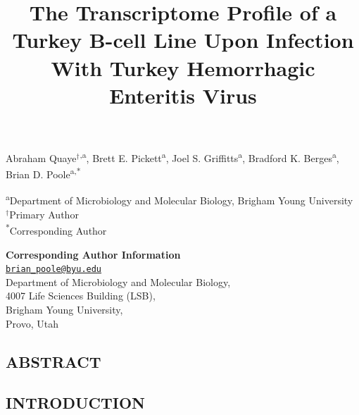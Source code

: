 \documentclass[
]{article}
\title{The Transcriptome Profile of a Turkey B-cell Line Upon Infection
With Turkey Hemorrhagic Enteritis Virus}
\author{}
\date{\vspace{-2.5em}}
\begin{document}
\maketitle

\vspace{5mm}

Abraham Quaye\({^\dagger}\)\textsuperscript{,a}, Brett E.
Pickett\textsuperscript{a}, Joel S. Griffitts\textsuperscript{a},
Bradford K. Berges\textsuperscript{a}, Brian D.
Poole\textsuperscript{a,*}

\vspace{5mm}

\textsuperscript{a}Department of Microbiology and Molecular Biology,
Brigham Young University\\
\({^\dagger}\)Primary Author\\
\textsuperscript{*}Corresponding Author

\vspace{5mm}

\textbf{Corresponding Author Information}\\
\href{mailto:brian_poole@byu.edu}{\nolinkurl{brian\_poole@byu.edu}}\\
Department of Microbiology and Molecular Biology,\\
4007 Life Sciences Building (LSB),\\
Brigham Young University,\\
Provo, Utah\\

\newpage

\subsection{ABSTRACT}\label{abstract}

\newpage

\subsection{INTRODUCTION}\label{introduction}
\end{document}
